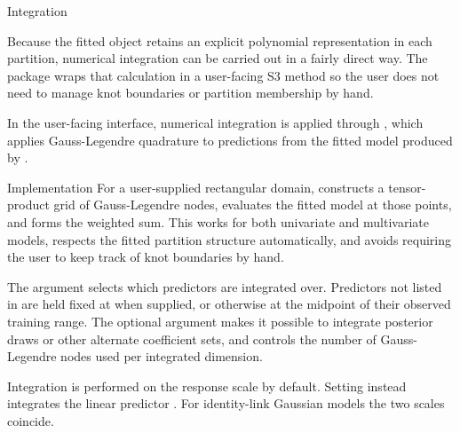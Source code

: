 \begin{Section}{Integration}


Because the fitted object retains an explicit polynomial representation in
each partition, numerical integration can be carried out in a fairly direct
way. The package wraps that calculation in a user-facing S3 method so the
user does not need to manage knot boundaries or partition membership by hand.

In the user-facing interface, numerical integration is applied through
, which applies Gauss-Legendre quadrature to
predictions from the fitted model produced by .

%
\begin{SubSection}{Implementation}
For a user-supplied rectangular domain,  constructs a
tensor-product grid of Gauss-Legendre nodes, evaluates the fitted model at
those points, and forms the weighted sum. This works for both univariate and
multivariate models, respects the fitted partition structure automatically,
and avoids requiring the user to keep track of knot boundaries by hand.

The  argument selects which predictors are integrated over.
Predictors not listed in  are held fixed at
 when supplied, or otherwise at the midpoint of their
observed training range. The optional  argument makes it
possible to integrate posterior draws or other alternate coefficient sets,
and  controls the number of Gauss-Legendre nodes used per
integrated dimension.

Integration is performed on the response scale by default. Setting
 instead integrates the linear predictor
. For identity-link Gaussian models the two scales
coincide.
\end{SubSection}

\end{Section}
%
